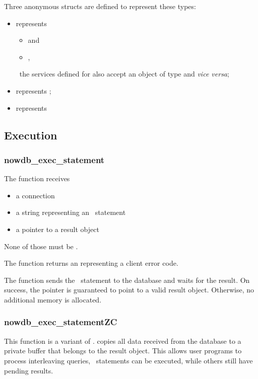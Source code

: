 Three anonymous structs are defined to
represent these types:
\begin{itemize}
\item {} represents
\begin{itemize}
\item{} and
\item{},
\end{itemize}
\ie\ the services defined for 
also accept an object of type 
and \textit{vice versa};
\item {} 
represents ;
\item {} 
represents 
\end{itemize}

\subsection{Execution}
\subsubsection{nowdb\_exec\_statement}
The function receives
\begin{itemize}
\item a connection
\item a string representing an \sql\ statement
\item a pointer to a result object
\end{itemize}

None of those must be .

The function returns an  representing
a client error code.

The function sends the \sql\ statement
to the database and waits for the result.
On success,
the  pointer is guaranteed
to point to a valid result object.
Otherwise, no additional memory is allocated.

\subsubsection{nowdb\_exec\_statementZC}
This function is a  variant
of .
 copies all
data received from the database to a private
buffer that belongs to the result object.
This allows user programs to process
interleaving queries, \ie\
statements can be executed,
while others still have pending results.

